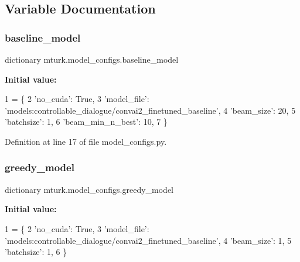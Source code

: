 \subsection{Variable Documentation}
\mbox{\label{namespacemturk_1_1model__configs_af563a384669a12e625c10788bdeb6e3c}} 
\subsubsection{\texorpdfstring{baseline\+\_\+model}{baseline\_model}}
{\footnotesize\ttfamily dictionary mturk.\+model\+\_\+configs.\+baseline\+\_\+model}

{\bfseries Initial value\+:}
\begin{DoxyCode}
1 =  \{
2     \textcolor{stringliteral}{'no\_cuda'}: \textcolor{keyword}{True},
3     \textcolor{stringliteral}{'model\_file'}: \textcolor{stringliteral}{'models:controllable\_dialogue/convai2\_finetuned\_baseline'},
4     \textcolor{stringliteral}{'beam\_size'}: 20,
5     \textcolor{stringliteral}{'batchsize'}: 1,
6     \textcolor{stringliteral}{'beam\_min\_n\_best'}: 10,
7 \}
\end{DoxyCode}


Definition at line 17 of file model\+\_\+configs.\+py.

\mbox{\label{namespacemturk_1_1model__configs_a85bd1dcb565bb2ca8c6c0e7f326e350e}} 
\subsubsection{\texorpdfstring{greedy\+\_\+model}{greedy\_model}}
{\footnotesize\ttfamily dictionary mturk.\+model\+\_\+configs.\+greedy\+\_\+model}

{\bfseries Initial value\+:}
\begin{DoxyCode}
1 =  \{
2     \textcolor{stringliteral}{'no\_cuda'}: \textcolor{keyword}{True},
3     \textcolor{stringliteral}{'model\_file'}: \textcolor{stringliteral}{'models:controllable\_dialogue/convai2\_finetuned\_baseline'},
4     \textcolor{stringliteral}{'beam\_size'}: 1,
5     \textcolor{stringliteral}{'batchsize'}: 1,
6 \}
\end{DoxyCode}


